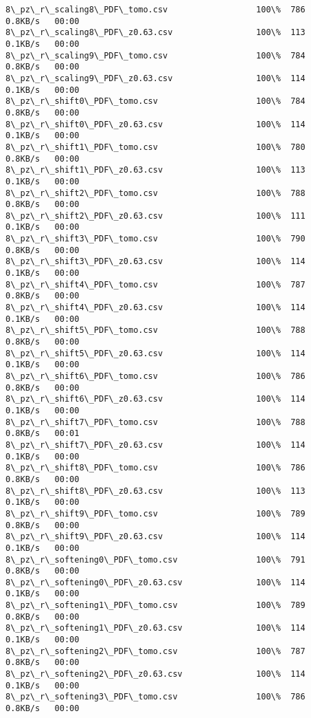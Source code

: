 \documentclass[11pt]{article}
\begin{document}
\begin{Verbatim}[commandchars=\\\{\}]
8\_pz\_r\_scaling8\_PDF\_tomo.csv                  100\%  786     0.8KB/s   00:00    
8\_pz\_r\_scaling8\_PDF\_z0.63.csv                 100\%  113     0.1KB/s   00:00    
8\_pz\_r\_scaling9\_PDF\_tomo.csv                  100\%  784     0.8KB/s   00:00    
8\_pz\_r\_scaling9\_PDF\_z0.63.csv                 100\%  114     0.1KB/s   00:00    
8\_pz\_r\_shift0\_PDF\_tomo.csv                    100\%  784     0.8KB/s   00:00    
8\_pz\_r\_shift0\_PDF\_z0.63.csv                   100\%  114     0.1KB/s   00:00    
8\_pz\_r\_shift1\_PDF\_tomo.csv                    100\%  780     0.8KB/s   00:00    
8\_pz\_r\_shift1\_PDF\_z0.63.csv                   100\%  113     0.1KB/s   00:00    
8\_pz\_r\_shift2\_PDF\_tomo.csv                    100\%  788     0.8KB/s   00:00    
8\_pz\_r\_shift2\_PDF\_z0.63.csv                   100\%  111     0.1KB/s   00:00    
8\_pz\_r\_shift3\_PDF\_tomo.csv                    100\%  790     0.8KB/s   00:00    
8\_pz\_r\_shift3\_PDF\_z0.63.csv                   100\%  114     0.1KB/s   00:00    
8\_pz\_r\_shift4\_PDF\_tomo.csv                    100\%  787     0.8KB/s   00:00    
8\_pz\_r\_shift4\_PDF\_z0.63.csv                   100\%  114     0.1KB/s   00:00    
8\_pz\_r\_shift5\_PDF\_tomo.csv                    100\%  788     0.8KB/s   00:00    
8\_pz\_r\_shift5\_PDF\_z0.63.csv                   100\%  114     0.1KB/s   00:00    
8\_pz\_r\_shift6\_PDF\_tomo.csv                    100\%  786     0.8KB/s   00:00    
8\_pz\_r\_shift6\_PDF\_z0.63.csv                   100\%  114     0.1KB/s   00:00    
8\_pz\_r\_shift7\_PDF\_tomo.csv                    100\%  788     0.8KB/s   00:01    
8\_pz\_r\_shift7\_PDF\_z0.63.csv                   100\%  114     0.1KB/s   00:00    
8\_pz\_r\_shift8\_PDF\_tomo.csv                    100\%  786     0.8KB/s   00:00    
8\_pz\_r\_shift8\_PDF\_z0.63.csv                   100\%  113     0.1KB/s   00:00    
8\_pz\_r\_shift9\_PDF\_tomo.csv                    100\%  789     0.8KB/s   00:00    
8\_pz\_r\_shift9\_PDF\_z0.63.csv                   100\%  114     0.1KB/s   00:00    
8\_pz\_r\_softening0\_PDF\_tomo.csv                100\%  791     0.8KB/s   00:00    
8\_pz\_r\_softening0\_PDF\_z0.63.csv               100\%  114     0.1KB/s   00:00    
8\_pz\_r\_softening1\_PDF\_tomo.csv                100\%  789     0.8KB/s   00:00    
8\_pz\_r\_softening1\_PDF\_z0.63.csv               100\%  114     0.1KB/s   00:00    
8\_pz\_r\_softening2\_PDF\_tomo.csv                100\%  787     0.8KB/s   00:00    
8\_pz\_r\_softening2\_PDF\_z0.63.csv               100\%  114     0.1KB/s   00:00    
8\_pz\_r\_softening3\_PDF\_tomo.csv                100\%  786     0.8KB/s   00:00    

\end{Verbatim}
\end{document}
